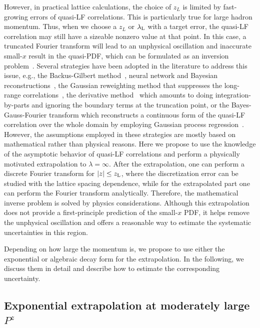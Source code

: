 \documentclass[preprint,12pt]{elsarticle}
\begin{document}
However, in practical lattice calculations, the choice of $z_L$ is limited by fast-growing errors of quasi-LF correlations. This is particularly true for large hadron momentum.
Thus, when we choose a $z_L$ or $\lambda_{\rm L}$ with a target error, the quasi-LF correlation may still have a sizeable nonzero value at that point. In this case, a truncated Fourier transform will lead to an unphysical oscillation and inaccurate small-$x$ result in the quasi-PDF, which can be formulated as an inversion problem~\cite{Karpie:2019eiq}. Several strategies have been adopted in the literature to address this issue, e.g., the Backus-Gilbert method~\cite{Karpie:2019eiq,Bhat:2020ktg}, neural network and Bayesian reconstructions~\cite{Karpie:2019eiq}, the Gaussian reweighting method that suppresses the long-range correlations~\cite{Ishikawa:2019flg}, the derivative method~\cite{Lin:2017ani} which amounts to doing integration-by-parts and ignoring the boundary terms at the truncation point, or the Bayes-Gauss-Fourier transform which reconstructs a continuous form of the quasi-LF correlation over the whole domain by employing Gaussian process regression~\cite{Alexandrou:2020tqq}. However, the assumptions employed in these strategies are mostly based on mathematical rather than physical reasons. Here we propose to use the knowledge of the asymptotic behavior of quasi-LF correlations and perform a physically motivated extrapolation to $\lambda\!=\!\infty$.
After the extrapolation, one can perform a discrete Fourier transform for $|z|\le z_{\rm L}$, where the discretization error can be studied with the lattice spacing dependence, while for the extrapolated part one can perform the Fourier transform analytically. Therefore, the mathematical inverse problem is solved by physics considerations. 
Although this extrapolation does not provide a first-principle prediction of the small-$x$ PDF, it helps remove the unphysical oscillation and offers a reasonable way to estimate the systematic uncertainties in this region.

Depending on how large the momentum is, we propose to use either the exponential or algebraic decay form for the extrapolation. In the following, we discuss them in detail and describe how to estimate the corresponding uncertainty.


\subsection{Exponential extrapolation at moderately large $P^z$}
\end{document}
